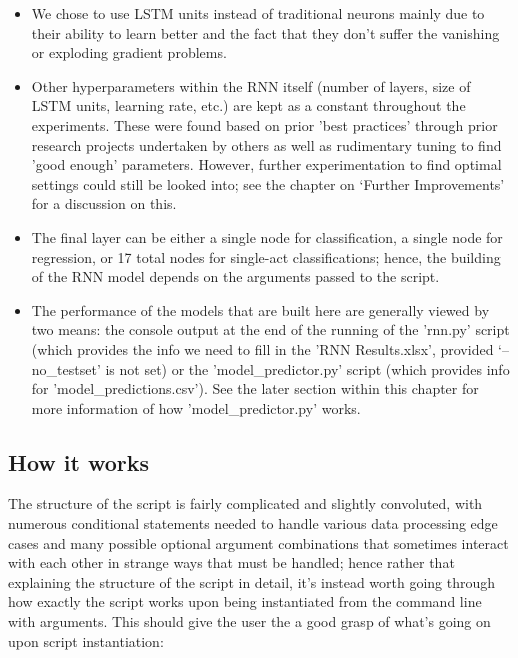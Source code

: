 \documentclass[12pt,twoside]{report}
\begin{document}
\begin{itemize}
	\item We chose to use LSTM units instead of traditional neurons mainly due to their ability to learn better and the fact that they don't suffer the vanishing or exploding gradient problems.
	\item Other hyperparameters within the RNN itself (number of layers, size of LSTM units, learning rate, etc.) are kept as a constant throughout the experiments. These were found based on prior 'best practices' through prior research projects undertaken by others as well as rudimentary tuning to find 'good enough' parameters. However, further experimentation to find optimal settings could still be looked into; see the chapter on ‘Further Improvements’ for a discussion on this.
	\item The final layer can be either a single node for classification, a single node for regression, or 17 total nodes for single-act classifications; hence, the building of the RNN model depends on the arguments passed to the script.
	\item The performance of the models that are built here are generally viewed by two means: the console output at the end of the running of the 'rnn.py' script (which provides the info we need to fill in the 'RNN Results.xlsx', provided ‘--no\_testset’ is not set) or the 'model\_predictor.py' script (which provides info for 'model\_predictions.csv'). See the later section within this chapter for more information of how 'model\_predictor.py’ works.
\end{itemize}


\subsection{How it works}

\quad The structure of the script is fairly complicated and slightly convoluted, with numerous conditional statements needed to handle various data processing edge cases and many possible optional argument combinations that sometimes interact with each other in strange ways that must be handled; hence rather that explaining the structure of the script in detail, it's instead worth going through how exactly the script works upon being instantiated from the command line with arguments. This should give the user the a good grasp of what's going on upon script instantiation:
\end{document}
